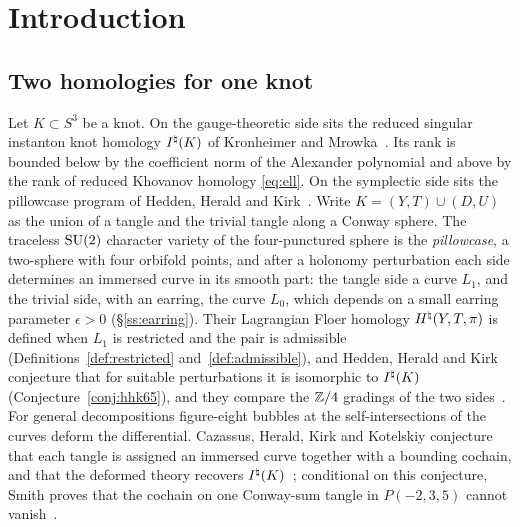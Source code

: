 \section{Introduction}\label{sec:intro}

\subsection{Two homologies for one knot}
Let $K\subset S^3$ be a knot. On the gauge-theoretic side sits the reduced singular instanton knot
homology $I^{\natural}(K)$ of Kronheimer and Mrowka~\cite{KM1,KM2}. Its rank is bounded below by the
coefficient norm of the Alexander polynomial and above by the rank of reduced Khovanov homology
\eqref{eq:ell}. On the symplectic side sits the pillowcase program of Hedden, Herald and
Kirk~\cite{HHK1,HHK2}. Write $K=(Y,T)\cup(D,U)$ as the union of a tangle and the trivial tangle along a
Conway sphere. The traceless $\mathrm{SU}(2)$ character variety of the four-punctured sphere is the
\emph{pillowcase}, a two-sphere with four orbifold points, and after a holonomy perturbation each side
determines an immersed curve in its smooth part: the tangle side a curve $L_1$, and the trivial side,
with an earring, the curve $L_0$, which depends on a small earring parameter $\epsilon>0$ (\S\ref{ss:earring}). Their Lagrangian Floer homology $H^{\natural}(Y,T,\pi)$ is defined when $L_1$ is restricted and the pair is admissible (Definitions~\ref{def:restricted} and~\ref{def:admissible}), and Hedden, Herald and Kirk conjecture that for suitable perturbations it is
isomorphic to $I^{\natural}(K)$~\cite[Conj.~6.5]{HHK2} (Conjecture~\ref{conj:hhk65}), and they compare the $\mathbb{Z}/4$
gradings of the two sides~\cite[\S\S6.1, 11]{HHK2}.
For general decompositions figure-eight bubbles at the self-intersections of the curves deform the
differential. Cazassus, Herald, Kirk and Kotelskiy conjecture that each tangle is assigned an immersed
curve together with a bounding cochain, and that the deformed theory recovers
$I^{\natural}(K)$~\cite[Conj.~D]{CHKK}; conditional on this conjecture, Smith proves that the cochain on one
Conway-sum tangle in $P(-2,3,5)$ cannot vanish~\cite[proof of Thm.~5.9]{Smith}.

